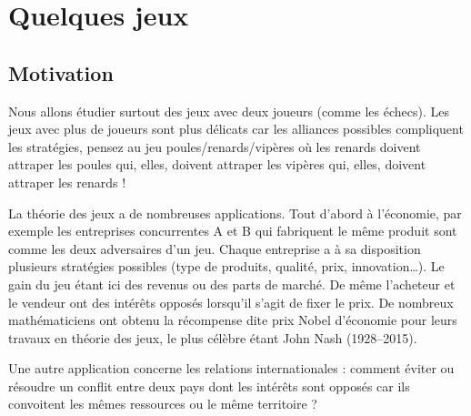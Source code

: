 \documentclass[11pt,class=report,crop=false]{standalone}
\begin{document}








\section{Quelques jeux}

\subsection{Motivation}

Nous allons étudier surtout des jeux avec deux joueurs (comme les échecs).
Les jeux avec plus de joueurs sont plus délicats car les alliances possibles compliquent les stratégies, pensez au jeu \og{}poules/renards/vipères\fg{} où les renards doivent attraper les poules qui, elles, doivent attraper les vipères qui, elles, doivent attraper les renards !

La théorie des jeux a de nombreuses applications. Tout d'abord à l'économie, par exemple les entreprises concurrentes A et B qui fabriquent le même produit sont comme les deux adversaires d'un jeu. Chaque entreprise a à sa disposition plusieurs stratégies possibles (type de produits, qualité, prix, innovation\ldots). Le gain du jeu étant ici des revenus ou des parts de marché.
De même l'acheteur et le vendeur ont des intérêts opposés lorsqu'il s'agit de fixer le prix.
De nombreux mathématiciens ont obtenu la récompense dite \og{}prix Nobel d'économie\fg{} pour leurs travaux en théorie des jeux, le plus célèbre étant John Nash (1928--2015).

Une autre application concerne les relations internationales : comment éviter ou résoudre un conflit entre deux pays dont les intérêts sont opposés car ils convoitent les mêmes ressources ou le même territoire ?
\end{document}
